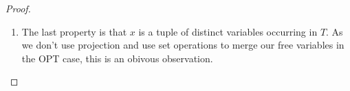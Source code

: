 \begin{proof}
\begin{enumerate}
\begin{enumerate}
				\item Induction Step: If $\hat{P}$ is $(\mbox{SERVICE } u \ P_1)$:
						The proof is analogously to case where $\hat{P}$ is
						$(\mbox{GRAPH} u \ P_1)$.

			\end{enumerate}
		\item The last property is that $x$ is a tuple of distinct variables
			occurring in $T$. As we don't use projection and use set operations
			to merge our free variables in the OPT case, this is an obivous
			observation.
	\end{enumerate}
\end{proof}


